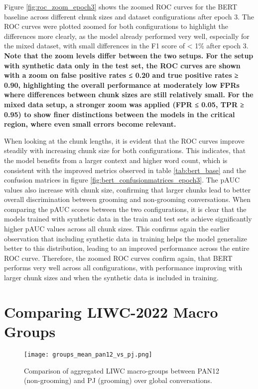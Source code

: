 Figure \ref{fig:roc_zoom_epoch3} shows the zoomed ROC curves for the BERT baseline across different chunk sizes and dataset configurations after epoch 3. The ROC curves were plotted zoomed for both configurations to highlight the differences more clearly, as the model already performed very well, especially for the mixed dataset, with small differences in the F1 score of < 1\% after epoch 3. \textbf{Note that the zoom levels differ between the two setups. For the setup with synthetic data only in the test set, the ROC curves are shown with a zoom on false positive rates ≤ 0.20 and true positive rates ≥ 0.90, highlighting the overall performance at moderately low FPRs where differences between chunk sizes are still relatively small. For the mixed data setup, a stronger zoom was applied (FPR ≤ 0.05, TPR ≥ 0.95) to show finer distinctions between the models in the critical region, where even small errors become relevant.} 

When looking at the chunk lengths, it is evident that the ROC curves improve steadily with increasing chunk size for both configurations. This indicates, that the model benefits from a larger context and higher word count, which is consistent with the improved metrics observed in table \ref{tab:bert_base} and the confusion matrices in figure \ref{fig:bert_confusionmatrices_epoch3}. The pAUC values also increase with chunk size, confirming that larger chunks lead to better overall discrimination between grooming and non-grooming conversations. When comparing the pAUC scores between the two configurations, it is clear that the models trained with synthetic data in the train and test sets achieve significantly higher pAUC values across all chunk sizes. This confirms again the earlier observation that including synthetic data in training helps the model generalize better to this distribution, leading to an improved performance across the entire ROC curve. Therefore, the zoomed ROC curves confirm again, that BERT performs very well across all configurations, with performance improving with larger chunk sizes and when the synthetic data is included in training.


\section{Comparing LIWC-2022 Macro Groups} \label{sec:global_liwc_analysis}


\begin{figure}[ht]
    \centering
    \texttt{[image: groups\_mean\_pan12\_vs\_pj.png]}
    \caption[Comparison of aggregated LIWC macro-groups]{Comparison of aggregated LIWC macro-groups between PAN12 (non-grooming) and PJ (grooming) over global conversations.}
    \label{fig:liwc_macro_groups}
\end{figure}


